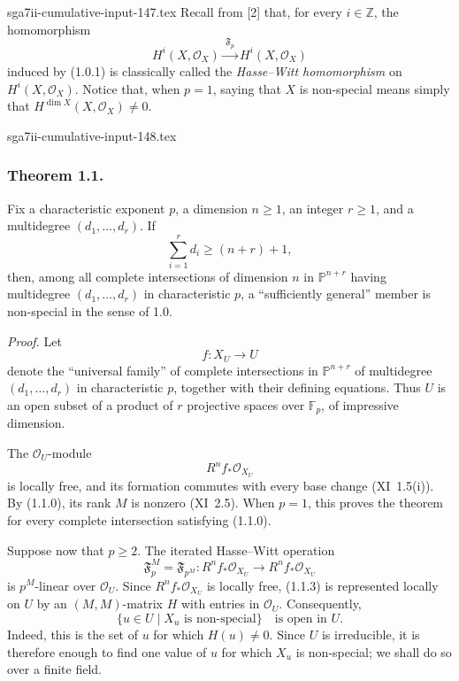 \begin{filecontents*}{sga7ii-cumulative-input-147.tex}
Recall from \textup{[2]} that, for every $i\in\mathbb Z$, the homomorphism
\begin{equation*}
H^i(X,\mathcal O_X)\xrightarrow{\ \mathfrak F_p\ }H^i(X,\mathcal O_X)
\end{equation*}
induced by (1.0.1) is classically called the \emph{Hasse--Witt
homomorphism} on $H^i(X,\mathcal O_X)$.  Notice that, when $p=1$, saying
that $X$ is non-special means simply that
$H^{\dim X}(X,\mathcal O_X)\ne0$.
\end{filecontents*}
\begin{filecontents*}{sga7ii-cumulative-input-148.tex}
\subsubsection*{Theorem 1.1.}
Fix a characteristic exponent $p$, a dimension $n\geq1$, an integer
$r\geq1$, and a multidegree $(d_1,\dots,d_r)$.  If
\begin{equation}\tag{1.1.0}
\sum_{i=1}^{r}d_i\geq(n+r)+1,
\end{equation}
then, among all complete intersections of dimension $n$ in
$\mathbb P^{n+r}$ having multidegree $(d_1,\dots,d_r)$ in characteristic
$p$, a ``sufficiently general'' member is non-special in the sense of 1.0.

\medskip
\noindent\emph{Proof.}
Let
\begin{equation}\tag{1.1.1}
f:X_U\longrightarrow U
\end{equation}
denote the ``universal family'' of complete intersections in
$\mathbb P^{n+r}$ of multidegree $(d_1,\dots,d_r)$ in characteristic $p$,
together with their defining equations.  Thus $U$ is an open subset of a
product of $r$ projective spaces over $\mathbb F_p$, of impressive
dimension.

The $\mathcal O_U$-module
\begin{equation}\tag{1.1.2}
R^nf_*\mathcal O_{X_U}
\end{equation}
is locally free, and its formation commutes with every base change
(XI~1.5(i)).  By (1.1.0), its rank $M$ is nonzero (XI~2.5).  When $p=1$,
this proves the theorem for every complete intersection satisfying (1.1.0).

Suppose now that $p\geq2$.  The iterated Hasse--Witt operation
\begin{equation}\tag{1.1.3}
\mathfrak F_p^M=\mathfrak F_{p^M}:
R^nf_*\mathcal O_{X_U}\longrightarrow R^nf_*\mathcal O_{X_U}
\end{equation}
is $p^M$-linear over $\mathcal O_U$.  Since
$R^nf_*\mathcal O_{X_U}$ is locally free, (1.1.3) is represented locally on
$U$ by an $(M,M)$-matrix $H$ with entries in $\mathcal O_U$.  Consequently,
\begin{equation}\tag{1.1.4}
\{u\in U\mid X_u\text{ is non-special}\}\quad\text{is open in }U.
\end{equation}
Indeed, this is the set of $u$ for which $H(u)\ne0$.  Since $U$ is
irreducible, it is therefore enough to find one value of $u$ for which
$X_u$ is non-special; we shall do so over a finite field.


\end{filecontents*}
